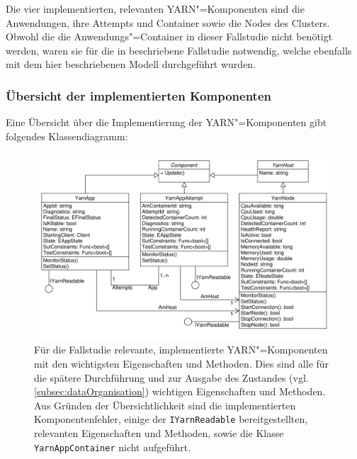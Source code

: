 Die vier implementierten, relevanten \ac{YARN}"=Komponenten sind die Anwendungen, ihre Attempts und Container sowie die Nodes des Clusters.
Obwohl die die Anwendungs"=Container in dieser Fallstudie nicht benötigt werden, waren sie für die in \cite{Eberhardinger2018} beschriebene Fallstudie notwendig, welche ebenfalls mit dem hier beschriebenen Modell durchgeführt wurden.

\subsubsection{Übersicht der implementierten Komponenten}
\label{subsec:yarnComponentsOverview}

Eine Übersicht über die Implementierung der \ac{YARN}"=Komponenten gibt folgendes Klassendiagramm:

\begin{figure}[h]
    \includegraphics[width=\columnwidth]{./images/yarnComponents.pdf}
    \caption[Für die Fallstudie relevante, implementierte \acs{YARN}"=Komponenten mit den wichtigsten Eigenschaften und Methoden]
        {Für die Fallstudie relevante, implementierte \acs{YARN}"=Komponenten mit den wichtigsten Eigenschaften und Methoden.
        Dies sind alle für die spätere Durchführung und zur Ausgabe des Zustandes (vgl. \cref{subsec:dataOrganisation}) wichtigen Eigenschaften und Methoden.
        Aus Gründen der Übersichtlichkeit sind die implementierten Komponentenfehler, einige der \texttt{IYarnReadable} bereitgestellten, relevanten Eigenschaften und Methoden, sowie die Klasse \texttt{YarnAppContainer} nicht aufgeführt.}
    \label{fig:yarnComponentsClassDiagram}
\end{figure}

